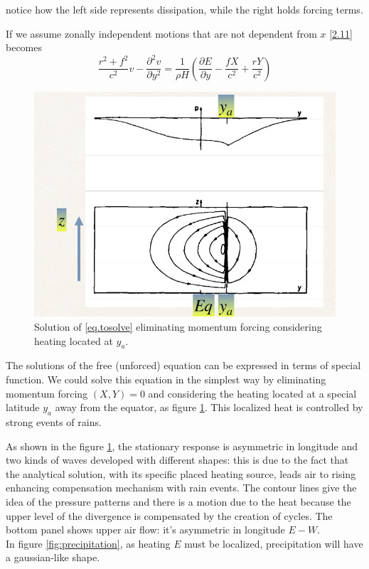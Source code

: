 notice how the left side represents dissipation, while the right holds forcing terms.

If we assume zonally independent motions that are not dependent from $x$ \ref{2.11} becomes
\begin{equation}\label{eq.tosolve}
	\frac{r^2 + f^2}{c^2} v - \frac{\partial^2 v}{\partial y^2} = \frac{1}{\rho H} \left( \frac{\partial E}{\partial y} - \frac{fX}{c^2} + \frac{rY}{c^2} \right)
\end{equation}
\begin{figure}[htpb]
	\centering
	\includegraphics[width=0.35\linewidth]{upload/60image.png}
	\caption{Solution of \ref{eq.tosolve} eliminating momentum forcing considering heating located at $y_a$.}
	\label{fig:sol}
\end{figure}
The solutions of the free (unforced) equation can be expressed in terms of special function. We could solve this equation in the simplest way by eliminating momentum forcing $(X,Y)=0$ and considering the heating located at a special latitude $y_a$ away from the equator, as figure \ref{fig:sol}. This localized heat is controlled by strong events of rains.

As shown in the figure \ref{fig:sol}, the stationary response is asymmetric in longitude and two kinds of waves developed with different shapes: this is due to the fact that the analytical solution, with its specific placed heating source, leads air to rising enhancing compensation mechanism with rain events.
The contour lines give the idea of the pressure patterns and there is a motion due to the heat because the upper level of the divergence is compensated by the creation of cycles. The bottom panel shows upper air flow: it's asymmetric in longitude $E-W$. \\

In figure \ref{fig:precipitation}, as heating $E$ must be localized, precipitation will have a gaussian-like shape.

